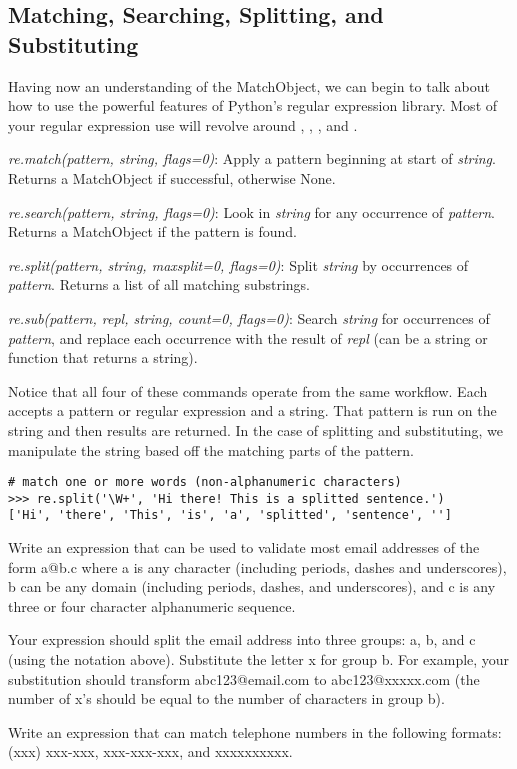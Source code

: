 \subsection*{Matching, Searching, Splitting, and Substituting}
Having now an understanding of the MatchObject, we can begin to talk about how to use the powerful features of Python's regular expression library.
Most of your regular expression use will revolve around , , , and .
\begin{description}
\item \emph{re.match(pattern, string, flags=0)}:  Apply a pattern beginning at start of \emph{string}.  Returns a MatchObject if successful, otherwise None.
\item \emph{re.search(pattern, string, flags=0)}:  Look in \emph{string} for any occurrence of \emph{pattern}.  Returns a MatchObject if the pattern is found.
\item \emph{re.split(pattern, string, maxsplit=0, flags=0)}: Split \emph{string} by occurrences of \emph{pattern}.  Returns a list of all matching substrings.
\item \emph{re.sub(pattern, repl, string, count=0, flags=0)}: Search \emph{string} for occurrences of \emph{pattern}, and replace each occurrence with the result of \emph{repl} (can be a string or function that returns a string).
\end{description}
Notice that all four of these commands operate from the same workflow.
Each accepts a pattern or regular expression and a string.
That pattern is run on the string and then results are returned.
In the case of splitting and substituting, we manipulate the string based off the matching parts of the pattern.
\begin{lstlisting}
# match one or more words (non-alphanumeric characters)
>>> re.split('\W+', 'Hi there! This is a splitted sentence.')
['Hi', 'there', 'This', 'is', 'a', 'splitted', 'sentence', '']
\end{lstlisting}

\begin{problem}
Write an expression that can be used to validate most email addresses of the form a@b.c where a is any character (including periods, dashes and underscores), b can be any domain (including periods, dashes, and underscores), and c is any three or four character alphanumeric sequence.

Your expression should split the email address into three groups: a, b, and c (using the notation above).
Substitute the letter x for group b.
For example, your substitution should transform abc123@email.com to abc123@xxxxx.com (the number of x's should be equal to the number of characters in group b).
\label{prob:emailvaldiator}
\end{problem}

\begin{problem}
Write an expression that can match telephone numbers in the following formats: (xxx) xxx-xxx, xxx-xxx-xxx, and xxxxxxxxxx.
\end{problem}

